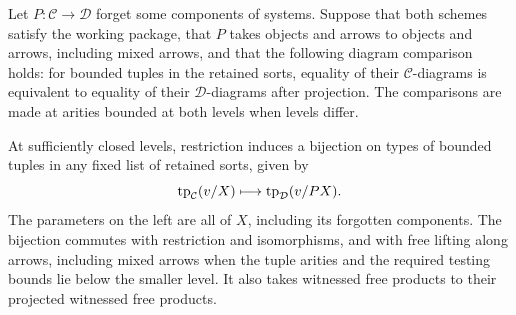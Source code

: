 \begin{proposition}
\label{iter:projection-types}
Let $P:\mathcal C\longrightarrow\mathcal D$ forget some components of
systems. Suppose that both schemes satisfy the working package,
that $P$ takes objects and arrows to objects and arrows, including
mixed arrows, and that the following diagram comparison holds: for
bounded tuples in the retained sorts, equality of their
$\mathcal C$-diagrams is equivalent to equality of their
$\mathcal D$-diagrams after projection. The comparisons are made at
arities bounded at both levels when levels differ.

At sufficiently closed levels, restriction induces a bijection
on types of bounded tuples in any fixed list of retained sorts,
given by
\[
 \operatorname{tp}_{\mathcal C}(v/X)\longmapsto\operatorname{tp}_{\mathcal D}(v/PX).
\]
The parameters on the left are all of $X$, including its forgotten
components. The bijection commutes with restriction and isomorphisms,
and with free lifting along arrows, including mixed arrows when the
tuple arities and the required testing bounds lie below the smaller
level. It also takes witnessed free products to their projected
witnessed free products.
\end{proposition}

